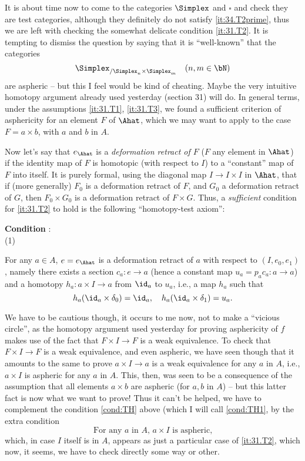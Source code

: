 It is about time now to come to the categories $\Simplex$ and $\square$
and check they are test categories, although they definitely do not
satisfy \ref{it:34.T2prime}, thus we are left with checking the
somewhat delicate condition \ref{it:31.T2}. It is tempting to dismiss
the question by saying that it is ``well-known'' that the categories
\[\Simplex_{/\Simplex_n\times\Simplex_m}\quad(n,m\in\bN)\]
are aspheric -- but this I feel would be kind of cheating. Maybe the
very intuitive homotopy argument already used yesterday (section 31)
will do. In general terms, under the assumptions \ref{it:31.T1},
\ref{it:31.T3}, we found a sufficient criterion of asphericity for an
element $F$ of $\Ahat$, which we may want to apply to the case
$F=a\times b$, with $a$ and $b$ in $A$.

Now let's say that $e_{\Ahat}$ is a \emph{deformation retract of
  $F$} ($F$ any element in $\Ahat$) if the identity map of $F$ is
homotopic (with respect to $I$) to a ``constant'' map of $F$ into
itself. It is purely formal, using the diagonal map $I\to I\times I$
in $\Ahat$, that if (more generally) $F_0$ is a deformation
retract of $F$, and $G_0$ a deformation retract of $G$, then
$F_0\times G_0$ is a deformation retract of $F\times G$. Thus, a
\emph{sufficient} condition for \ref{it:31.T2} to hold is the
following ``homotopy-test axiom'':

\noindent\parbox[t]{0.3\textwidth}{\textbf{Condition}
  :\\[\baselineskip]%
  \hspace*{3em}(1)}%
\parbox[t]{0.7\textwidth}{For any $a\in A$, $e=e_{\Ahat}$ is a
  deformation retract of $a$ with respect to $(I,e_0,e_1)$, namely
  there exists a section $c_a : e\to a$ (hence a constant map $u_a =
  p_ac_a : a\to a$) and a homotopy $h_a:a\times I\to a$ from $\id_a$
  to $u_a$, i.e., a map $h_a$ such that
  \[h_a(\id_a \times \delta_0) = \id_a , \quad
  h_a(\id_a\times\delta_1) = u_a.\]}

We have to be cautious though, it occurs to me now, not to make a
``vicious circle'', as the homotopy argument used yesterday for
proving asphericity of $f$ makes use of the fact that $F\times I\to F$
is a weak equivalence. To check that $F\times I\to F$ is a weak
equivalence, and even aspheric, we have seen though that it amounts to
the same to prove $a\times I\to a$ is a weak equivalence for any $a$
in $A$, i.e., $a\times I$ is aspheric for any $a$ in $A$. This, then,
was seen to be a consequence of the assumption that all elements
$a\times b$ are aspheric (for $a,b$ in $A$) -- but this latter fact is
now what we want to prove! Thus it can't be helped, we have to
complement the condition \ref{cond:TH} above (which I will call
\ref{cond:TH1}, by the extra condition
\begin{equation}
  \label{eq:34.2}
  \text{For any $a$ in $A$, $a\times I$ is aspheric,}
  \tag{2}
\end{equation}
which, in case $I$ itself is in $A$, appears as just a particular case
of \ref{it:31.T2}, which now, it seems, we have to check directly some
way or other.

